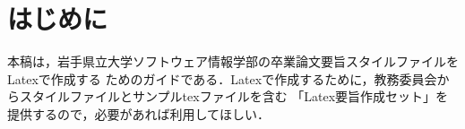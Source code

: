 \documentclass[main]{subfiles}
\begin{document}
\section{はじめに}
本稿は，岩手県立大学ソフトウェア情報学部の卒業論文要旨スタイルファイルをLatex\cite{bibunsho}で作成する
ためのガイドである．Latexで作成するために，教務委員会からスタイルファイルとサンプルtexファイルを含む
「Latex要旨作成セット」を提供するので，必要があれば利用してほしい．
\end{document}
